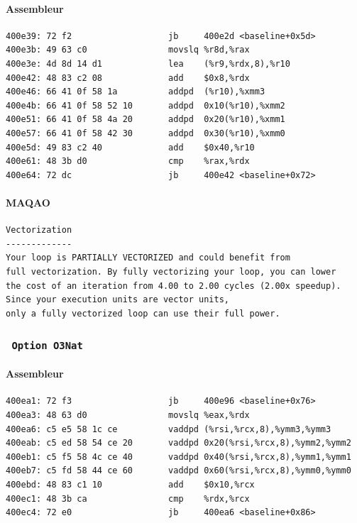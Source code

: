 \documentclass{report}
\begin{document}
      \paragraph{Assembleur}
        \begin{tcolorbox}
          \begin{verbatim}
400e39:	72 f2                	jb     400e2d <baseline+0x5d>
400e3b:	49 63 c0             	movslq %r8d,%rax
400e3e:	4d 8d 14 d1          	lea    (%r9,%rdx,8),%r10
400e42:	48 83 c2 08          	add    $0x8,%rdx
400e46:	66 41 0f 58 1a       	addpd  (%r10),%xmm3
400e4b:	66 41 0f 58 52 10    	addpd  0x10(%r10),%xmm2
400e51:	66 41 0f 58 4a 20    	addpd  0x20(%r10),%xmm1
400e57:	66 41 0f 58 42 30    	addpd  0x30(%r10),%xmm0
400e5d:	49 83 c2 40          	add    $0x40,%r10
400e61:	48 3b d0             	cmp    %rax,%rdx
400e64:	72 dc                	jb     400e42 <baseline+0x72>
        \end{verbatim}
      \end{tcolorbox}
      \paragraph{MAQAO}
        \begin{tcolorbox}
          \begin{verbatim}
Vectorization
-------------
Your loop is PARTIALLY VECTORIZED and could benefit from
full vectorization. By fully vectorizing your loop, you can lower
the cost of an iteration from 4.00 to 2.00 cycles (2.00x speedup).
Since your execution units are vector units,
only a fully vectorized loop can use their full power.
        \end{verbatim}
      \end{tcolorbox}
      \subsubsection{ \texttt{ Option O3Nat} }
      \paragraph{Assembleur}
        \begin{tcolorbox}
          \begin{verbatim}
400ea1:	72 f3                	jb     400e96 <baseline+0x76>
400ea3:	48 63 d0             	movslq %eax,%rdx
400ea6:	c5 e5 58 1c ce       	vaddpd (%rsi,%rcx,8),%ymm3,%ymm3
400eab:	c5 ed 58 54 ce 20    	vaddpd 0x20(%rsi,%rcx,8),%ymm2,%ymm2
400eb1:	c5 f5 58 4c ce 40    	vaddpd 0x40(%rsi,%rcx,8),%ymm1,%ymm1
400eb7:	c5 fd 58 44 ce 60    	vaddpd 0x60(%rsi,%rcx,8),%ymm0,%ymm0
400ebd:	48 83 c1 10          	add    $0x10,%rcx
400ec1:	48 3b ca             	cmp    %rdx,%rcx
400ec4:	72 e0                	jb     400ea6 <baseline+0x86>
        \end{verbatim}
      \end{tcolorbox}
\end{document}
